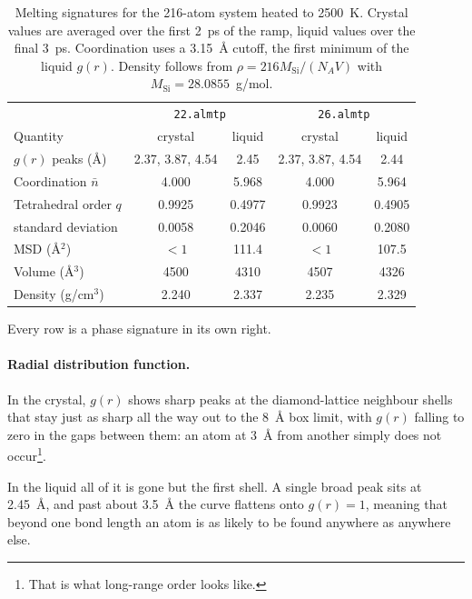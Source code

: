 \documentclass{article}
\begin{document}
\begin{table}[H]
    \renewcommand{\arraystretch}{1.3}
    \centering
    \small
    \begin{tabular}{p{}|c|c|c|c}
        \toprule
        & \multicolumn{2}{c|}{\texttt{22.almtp}} & \multicolumn{2}{c}{\texttt{26.almtp}} \\
        Quantity & crystal & liquid & crystal & liquid \\
        \midrule
        $g(r)$ peaks (\AA)      & 2.37, 3.87, 4.54 & 2.45 & 2.37, 3.87, 4.54 & 2.44 \\ \hline
        Coordination $\bar{n}$   & 4.000 & 5.968 & 4.000 & 5.964 \\ \hline
        Tetrahedral order $q$    & 0.9925 & 0.4977 & 0.9923 & 0.4905 \\
        standard deviation & 0.0058 & 0.2046 & 0.0060 & 0.2080 \\ \hline
        MSD (\AA$^2$)            & $<1$ & 111.4 & $<1$ & 107.5 \\ \hline
        Volume (\AA$^3$)         & 4500 & 4310 & 4507 & 4326 \\ \hline
        Density (g/cm$^3$)       & 2.240 & 2.337 & 2.235 & 2.329 \\
        \bottomrule
    \end{tabular}
    \caption{Melting signatures for the 216-atom system heated to 2500~K. Crystal values are averaged over the first 2~ps of the ramp, liquid values over the final 3~ps. Coordination uses a 3.15~\AA{} cutoff, the first minimum of the liquid $g(r)$. Density follows from $\rho = 216 M_{\text{Si}}/(N_A V)$ with $M_{\text{Si}} = 28.0855$~g/mol.}
    \label{tab:melt_signatures}
\end{table}

Every row is a phase signature in its own right.
\paragraph{Radial distribution function.}
In the crystal, $g(r)$ shows sharp peaks at the diamond-lattice neighbour shells that stay just as sharp all the way out to the 8~\AA{} box limit, with $g(r)$ falling to zero in the gaps between them: an atom at 3~\AA{} from another simply does not occur\footnote{That is what long-range order looks like.}.

In the liquid all of it is gone but the first shell. A single broad peak sits at 2.45~\AA, and past about 3.5~\AA{} the curve flattens onto $g(r) = 1$, meaning that beyond one bond length an atom is as likely to be found anywhere as anywhere else.
\end{document}
